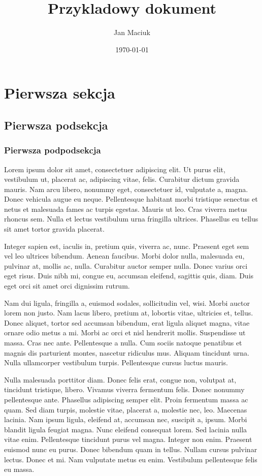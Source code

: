 \documentclass{article}
\title{Przykladowy dokument}
\author{Jan Maciuk}
\date{\today}
\begin{document}
\maketitle
\tableofcontents

\newpage
\section{Pierwsza sekcja}


\subsection{Pierwsza podsekcja}


\subsubsection{Pierwsza podpodsekcja}


Lorem ipsum dolor sit amet, consectetuer adipiscing elit. Ut purus elit, vestibulum ut, placerat ac, adipiscing vitae, felis. Curabitur dictum gravida mauris.
Nam arcu libero, nonummy eget, consectetuer id, vulputate a, magna. Donec vehicula augue eu neque. Pellentesque habitant morbi tristique senectus et netus et malesuada fames ac turpis egestas. 
Mauris ut leo. Cras viverra metus rhoncus sem. Nulla et lectus vestibulum urna fringilla ultrices. Phasellus eu tellus sit amet tortor gravida placerat. 

Integer sapien est, iaculis in, pretium quis, viverra ac, nunc. Praesent eget sem vel leo ultrices bibendum. Aenean faucibus.
Morbi dolor nulla, malesuada eu, pulvinar at, mollis ac, nulla. Curabitur auctor semper nulla. Donec varius orci eget risus. 
Duis nibh mi, congue eu, accumsan eleifend, sagittis quis, diam. Duis eget orci sit amet orci dignissim rutrum.

Nam dui ligula, fringilla a, euismod sodales, sollicitudin vel, wisi. Morbi
auctor lorem non justo. Nam lacus libero, pretium at, lobortis vitae, ultricies et,
tellus. Donec aliquet, tortor sed accumsan bibendum, erat ligula aliquet magna,
vitae ornare odio metus a mi. Morbi ac orci et nisl hendrerit mollis. Suspendisse
ut massa. Cras nec ante. Pellentesque a nulla. Cum sociis natoque penatibus et
magnis dis parturient montes, nascetur ridiculus mus. Aliquam tincidunt urna.
Nulla ullamcorper vestibulum turpis. Pellentesque cursus luctus mauris.

Nulla malesuada porttitor diam. Donec felis erat, congue non, volutpat at,
tincidunt tristique, libero. Vivamus viverra fermentum felis. Donec nonummy
pellentesque ante. Phasellus adipiscing semper elit. Proin fermentum massa
ac quam. Sed diam turpis, molestie vitae, placerat a, molestie nec, leo. Maecenas lacinia. Nam ipsum ligula, eleifend at, accumsan nec, suscipit a, ipsum.
Morbi blandit ligula feugiat magna. Nunc eleifend consequat lorem. Sed lacinia
nulla vitae enim. Pellentesque tincidunt purus vel magna. Integer non enim.
Praesent euismod nunc eu purus. Donec bibendum quam in tellus. Nullam cursus pulvinar lectus. Donec et mi. Nam vulputate metus eu enim. Vestibulum
pellentesque felis eu massa.
\end{document}

